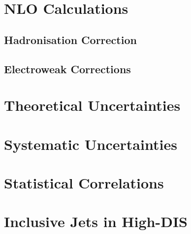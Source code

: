 \section{NLO Calculations}
\label{sec:nlopredictions}


\subsection{Hadronisation Correction}

% 
\subsection{Electroweak Corrections}


\section{Theoretical Uncertainties}
\label{sec:nlouncertainty}


\section{Systematic Uncertainties}
\label{subsec:systunc}


\section{Statistical Correlations}
\label{subsec:statcorel}


\section{Inclusive Jets in High-\qsq DIS}
\label{sec:incljetsncdis}


